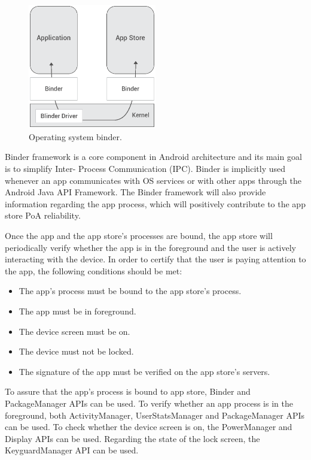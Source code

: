\begin{figure}[!ht]
\centering
\includegraphics[width=0.5\textwidth]{diagrams/binder_diagram.eps}
\caption{Operating system binder.}
\label{fig:binder}
\end{figure}

Binder framework is a core component in Android architecture and its main goal is to simplify Inter-
Process Communication (IPC). Binder is implicitly used whenever an app communicates with OS 
services or with other apps through the Android Java API Framework. The Binder framework will also 
provide information regarding the app process, which will positively contribute to the app store 
\textsf{PoA} reliability.

Once the app and the app store's processes are bound, the app store will periodically verify whether 
the app is in the foreground and the user is actively interacting with the device. In order to certify that 
the user is paying attention to the app, the following conditions should be met:

\begin{itemize}
\item The app's process must be bound to the app store's process.
\item The app must be in foreground.
\item The device screen must be on.
\item The device must not be locked. 
\item The signature of the app must be verified on the app store's servers.
\end{itemize}

To assure that the app's process is bound to app store, Binder and PackageManager APIs can be used. 
To verify whether an app process is in the foreground, both ActivityManager, UserStatsManager and 
 PackageManager APIs can be used. To check whether the device screen is on, the PowerManager 
and Display APIs can be used. Regarding the state of the lock screen, the KeyguardManager API can 
be used. 

